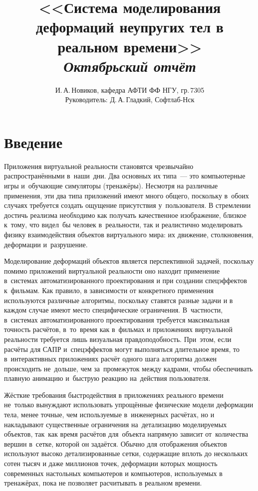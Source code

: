 \documentclass[a4paper,11pt]{report}
\author{И.\,А.\,Новиков, кафедра АФТИ ФФ НГУ, гр.\,7305\\ Руководитель: Д.\,А.\,Гладкий, Софтлаб-Нск}
\title{<<Система моделирования деформаций неупругих тел в реальном времени>>\\\itshape Октябрьский отчёт}
\begin{document}
  \maketitle
  \tableofcontents
  \chapter*{Введение}

    Приложения виртуальной реальности становятся чрезвычайно распространёнными в~наши~дни.  Два
    основных их типа~--- это компьютерные игры и~обучающие симуляторы (тренажёры). Несмотря на
    различные применения, эти два типа приложений имеют много общего, поскольку в~обоих случаях
    требуется создать ощущение присутствия у~пользователя. В стремлении достичь реализма необходимо
    как получать качественное изображение, близкое к~тому, что видел~бы человек в~реальности, так и
    реалистично моделировать физику взаимодействия объектов виртуального мира: их движение,
    столкновения, деформации и~разрушение.

    Моделирование деформаций объектов является перспективной задачей, поскольку помимо приложений
    виртуальной реальности оно находит применение в~системах автоматизированного проектирования и при
    создании спецэффектов к~фильмам.  Как правило, в зависимости от конкретного применения
    используются различные алгоритмы, поскольку ставятся разные задачи и в каждом случае имеют место
    специфические ограничения. В~частности, в~системах автоматизированного проектирования требуется
    максимальная точность расчётов, в~то~время как в~фильмах и приложениях виртуальной реальности
    требуется лишь визуальная правдоподобность. При~этом, если расчёты для САПР и~спецэффектов могут
    выполняться длительное время, то в~интерактивных приложениях расчёт одного шага алгоритма должен
    происходить не~дольше, чем за~промежуток между кадрами, чтобы обеспечивать плавную анимацию
    и~быструю реакцию на~действия пользователя.

    Жёсткие требования быстродействия в приложениях реального времени не~только вынуждают
    использовать упрощённые физические модели деформации тела, менее точные, чем используемые
    в~инженерных расчётах, но и накладывают существенные ограничения на~детализацию моделируемых
    объектов, так~как время расчётов для~объекта напрямую зависит от~количества вершин в~сетке,
    которой он задаётся. Обычно для отображения объектов используют высоко детализированные сетки,
    содержащие вплоть до нескольких сотен тысяч и даже миллионов точек, деформации которых мощность
    современных настольных компьютеров и компьютеров, используемых в тренажёрах, пока не позволяет
    расчитывать в реальном времени.
\end{document}
